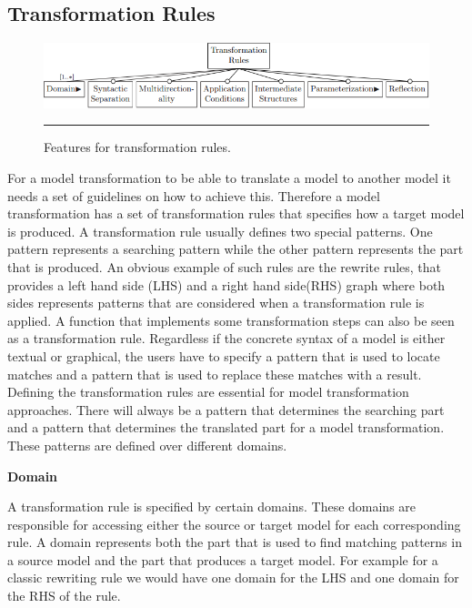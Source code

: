 \subsection{Transformation Rules}

\begin{figure}[H]
  \centering
    \includegraphics[scale=0.65]{./Figures/TransformationRules_1.png}
    \rule{35em}{0.5pt}
  \caption[Feature diagram for transformation rules]
  {Features for transformation rules.}
  \label{fig:TransformationRules}
\end{figure}

For a model transformation to be able to translate a model to another model it
needs a set of guidelines on how to achieve this. Therefore a model
transformation has a set of transformation rules that specifies how a target
model is produced. A transformation rule usually defines two special patterns.
One pattern represents a searching pattern while the other pattern represents
the part that is produced.  An obvious example of such rules are the rewrite
rules, that provides a left hand side (LHS) and a right hand side(RHS)
graph where both sides represents patterns that are considered
when a transformation rule is applied. A function that implements some
transformation steps can also be seen as a transformation rule. Regardless if
the concrete syntax of a model is either textual or graphical, the users have to
specify a pattern that is used to locate matches and a pattern that is used to replace
these matches with a result. Defining the transformation rules are essential for
model transformation approaches. There will always be a pattern that determines
the searching part and a pattern that determines the translated part for a model
transformation. These patterns are defined over different domains. 

\textbf{Domain}
\label{domain}

A transformation rule is specified by certain domains. These domains are
responsible for accessing either the source or target model for each
corresponding rule. A domain represents both the part that is used to find
matching patterns in a source model and the part that produces a target model.
For example for a classic rewriting rule we would have one domain for the LHS
and one domain for the RHS of the rule. 

